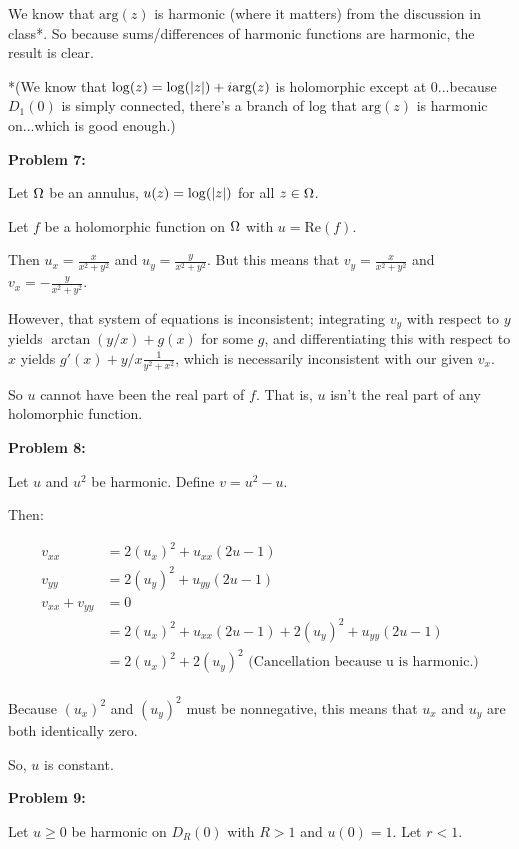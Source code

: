 \documentclass[a4paper,12pt]{article}
\begin{document}
We know that $\text{arg}(z)$ is harmonic (where it matters) from the discussion in class*. So because sums/differences of harmonic functions are harmonic, the result is clear.

*(We know that $\log(z) = \log(\left\lvert z \right\rvert) + i\text{arg}(z)$ is holomorphic except at $0$...because $D_1(0)$ is simply connected, there's a branch of log that $\text{arg}(z)$ is harmonic on...which is good enough.)

\shunt

{\bf Problem 7:}

Let $\Omega$ be an annulus, $u(z) = \log(\left\lvert z \right\rvert)$ for all $z \in \Omega$.

Let $f$ be a holomorphic function on $\Omega$ with $u = \text{Re}(f)$.

Then $u_x = \frac{x}{x^2+y^2}$ and $u_y = \frac{y}{x^2+y^2}$. But this means that $v_y = \frac{x}{x^2+y^2}$ and $v_x = -\frac{y}{x^2+y^2}$. 

However, that system of equations is inconsistent; integrating $v_y$ with respect to $y$ yields $\arctan(y/x) + g(x)$ for some $g$, and differentiating this with respect to $x$ yields $g'(x) + y/x \frac{1}{y^2+x^2}$, which is necessarily inconsistent with our given $v_x$.

So $u$ cannot have been the real part of $f$. That is, $u$ isn't the real part of any holomorphic function.

\shunt

{\bf Problem 8:}

Let $u$ and $u^2$ be harmonic. Define $v = u^2 - u$.

Then:

\begin{align*}
v_{xx} &= 2(u_x)^2 + u_{xx}(2u-1)\\
v_{yy} &= 2(u_y)^2 + u_{yy}(2u-1)\\
v_{xx} + v_{yy} &=0\\
&= 2(u_x)^2 + u_{xx}(2u-1) + 2(u_y)^2 + u_{yy}(2u-1)\\
&= 2(u_x)^2+ 2(u_y)^2 \text{ (Cancellation because u is harmonic.)}\\
\end{align*}

Because $(u_x)^2$ and $(u_y)^2$ must be nonnegative, this means that $u_x$ and $u_y$ are both identically zero.

So, $u$ is constant.

\shunt

{\bf Problem 9:}

Let $u \geq 0$ be harmonic on $D_R(0)$ with $R > 1$ and $u(0) = 1$. Let $r <1$.
\end{document}
